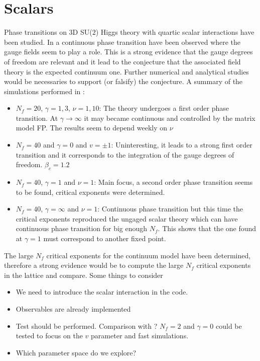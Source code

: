 \documentclass[]{scrartcl}
\begin{document}
\section{Scalars}
Phase transitions on 3D SU($2$) Higgs theory with quartic scalar interactions have been studied. In \cite{Bonati:2021rzx} a continuous phase transition have been observed where the gauge fields seem to play a role. This is a strong evidence that the gauge degrees of freedom are relevant and it lead to the conjecture that the associated field theory is the expected continuum one. Further numerical and analytical studies would be necessaries to support (or falsify) the conjecture. A summary of the simulations performed in \cite{Bonati:2021rzx}:
\begin{itemize}
	\item $N_f=20$, $\gamma=1,3$, $\nu=1,10$: The theory undergoes a first order phase transition. At $\gamma\rightarrow\infty$ it may became continuous and controlled by the matrix model FP. The results seem to depend weekly on $\nu$
	\item $N_f=40$ and $\gamma=0$ and $v=\pm1$: Uninteresting, it leads to a strong first order transition and it corresponds to the integration of the gauge degrees of freedom. $\beta_c=1.2$
	\item $N_f=40$, $\gamma=1$ and $\nu=1$: Main focus, a second order phase transition seems to be found, critical exponents were determined.
	\item $N_f=40$, $\gamma=\infty$ and $\nu=1$: Continuous phase transition but this time the critical exponents reproduced the ungaged scalar theory which can have continuous phase transition for big enough $N_f$. This shows that the one found at $\gamma=1$ must correspond to another fixed point.
\end{itemize}
The large $N_f$ critical exponents for the continuum model have been determined, therefore a strong evidence would be to compute the large $N_f$ critical exponents in the lattice and compare. Some things to consider
\begin{itemize}
	\item We need to introduce the scalar interaction in the code.
	\item Observables are already implemented
	\item Test should be performed. Comparison with \cite{Bonati:2021rzx}? $N_f=2$ and $\gamma=0$ could be tested to focus on the $v$ parameter and fast simulations.
	\item Which parameter space do we explore?
\end{itemize}
\end{document}
